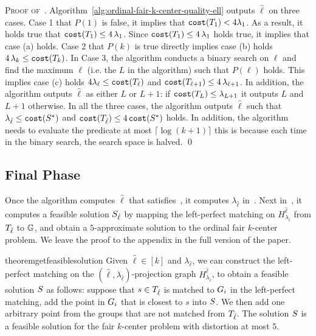 \documentclass{article}
\begin{document}
\textsc{Proof of~.}
    Algorithm~\ref{alg:ordinal-fair-k-center-quality-ell} outputs $\hat{\ell}$ on three cases. 
    Case 1 that $P(1)$ is false, it implies that $\texttt{cost}(T_{1}) < 4 \lambda_1$. 
    As a result, it holds true that $\texttt{cost}(T_{1}) \leq 4\,\lambda_{1}$. 
    Since $\texttt{cost}(T_{1}) \leq 4\,\lambda_{1}$ holds true, it implies that case (a) holds. 
    Case 2 that $P(k)$ is true directly implies case (b) holds $4\,\lambda_{k} \leq \texttt{cost}(T_{k})$.  
    In Case 3, the algorithm conducts a binary search on $\ell$ and find the maximum $\ell$ (i.e. the $L$ in the algorithm) such that $P(\ell)$ holds. This implies case (c) holds $4\lambda_{\ell} \leq \texttt{cost}(T_{\ell})$ and $\texttt{cost}(T_{\ell + 1}) \leq 4\, \lambda_{\ell +1}$.
    In addition, the algorithm outputs $\hat{\ell}$ as either $L$ or $L+1$: if $\texttt{cost}(T_{L}) \leq \lambda_{L+1}$ it outputs $L$ and $L+1$ otherwise.
    In all the three cases, the algorithm outputs $\hat{\ell}$ such that $\lambda_{\hat{\ell}} \leq \texttt{cost}(S^*)$ and $\texttt{cost}(T_{\hat{\ell}}) \leq 4\, \texttt{cost}(S^*)$ holds.
    In addition, the algorithm needs to evaluate the predicate at most $\lceil \log(k+1) \rceil$ this is because each time in the binary search, the search space is halved.
\hfill\qed


\subsection{Final Phase}\label{sec:finalphase}
Once the algorithm computes $\hat{\ell}$ that satisfies~, it computes $\lambda_{\hat{\ell}}$ in~.
Next in~, it computes a feasible solution $S_{\hat{\ell}}$ by mapping the left-perfect matching on $H^{\hat{\ell}}_{\lambda_{\hat{\ell}}}$ from $T_{\hat{\ell}}$ to $\mathbb{G}$,  and obtain a $5$-approximate solution to the ordinal fair $k$-center problem.
We leave the proof to the appendix in the full version of the paper. 
 
\begin{restatable}{theorem}{getfeasiblesolution}
    \label{theorem:get-feasible-solution} 
    Given $\hat{\ell} \in [k]$ and $\lambda_{\hat{\ell}}$, we can construct the left-perfect matching on the $(\hat{\ell}, \lambda_{\hat{\ell}})$-projection graph $H^{\hat{\ell}}_{\lambda_{\hat{\ell}}}$, to obtain a feasible solution $S$ as follows:
    suppose that $s \in T_{\hat{\ell}}$ is matched to $G_i$ in the left-perfect matching, 
    add the point in $G_i$ that is closest to $s$ into $S$. 
    We then add one arbitrary point from the groups that are not matched from $T_{\hat{\ell}}$. 
    The solution $S$ is a feasible solution for the fair $k$-center problem with distortion at most $5$.
\end{restatable}
\end{document}
